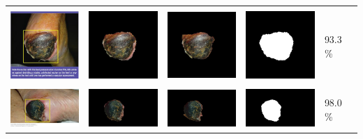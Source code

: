 \begin{table}[H]
\begin{tabular}{|m{1.1in}|m{1.1in}|m{1.1in}|m{1.1in}|m{0.7in}|}
		&  &  & \\
		\includegraphics[width=1.1in]{gambar/hasil_segmentasi/luka_hitam/image_4_rect.jpg} \fontsize{8}{12}{(60, 89, 162, 153)}&
		\includegraphics[width=1.1in]{gambar/hasil_segmentasi/luka_hitam/result_4.jpg}&
		\includegraphics[width=1.1in]{gambar/hasil_segmentasi/luka_hitam/result_4_cv.jpg}&
		\includegraphics[width=1.1in]{gambar/hasil_segmentasi/luka_hitam/mask_4.jpg}&
		93.3 \% \\
		\hline
		
		&  &  & \\
		\includegraphics[width=1.1in]{gambar/hasil_segmentasi/luka_hitam/image_5_rect.jpg} \fontsize{8}{12}{(68, 48, 115, 106)}&
		\includegraphics[width=1.1in]{gambar/hasil_segmentasi/luka_hitam/result_5.jpg}&
		\includegraphics[width=1.1in]{gambar/hasil_segmentasi/luka_hitam/result_5_cv.jpg}&
		\includegraphics[width=1.1in]{gambar/hasil_segmentasi/luka_hitam/mask_5.jpg}&
		98.0 \% \\
		\hline
		

\end{tabular}
\end{table}
